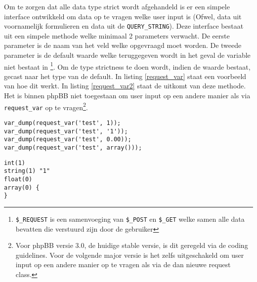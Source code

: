 Om te zorgen dat alle data type strict wordt afgehandeld is er een simpele interface ontwikkeld om data op te vragen welke user input is (Ofwel, data uit voornamelijk formulieren en data uit de \texttt{QUERY\_STRING}). Deze interface bestaat uit een simpele methode welke minimaal 2 parameters verwacht. De eerste parameter is de naam van het veld welke opgevraagd moet worden. De tweede parameter is de default waarde welke teruggegeven wordt in het geval de variable niet bestaat in \footnote{\texttt{\$\_REQUEST} is een samenvoeging van \texttt{\$\_POST} en \texttt{\$\_GET} welke samen alle data bevatten die verstuurd zijn door de gebruiker}. Om de type strictness te doen wordt, indien de waarde bestaat, gecast naar het type van de default. In listing \ref{request_var} staat een voorbeeld van hoe dit werkt. In listing \ref{request_var2} staat de uitkomt van deze methode. Het is binnen phpBB niet toegestaan om user input op een andere manier als via \texttt{request\_var} op te vragen\footnote{Voor phpBB versie 3.0, de huidige stable versie, is dit geregeld via de coding guidelines. Voor de volgende major versie is het zelfs uitgeschakeld om user input op een andere manier op te vragen als via de dan nieuwe request class.}.  
\begin{lstlisting}[label=request_var,caption=Voorbeeld van request\_var]
var_dump(request_var('test', 1));
var_dump(request_var('test', '1'));
var_dump(request_var('test', 0.00));
var_dump(request_var('test', array()));
\end{lstlisting}
\begin{lstlisting}[label=request_var2,caption=Uitkomt van request\_var]
int(1)
string(1) "1"
float(0)
array(0) {
}
\end{lstlisting}

